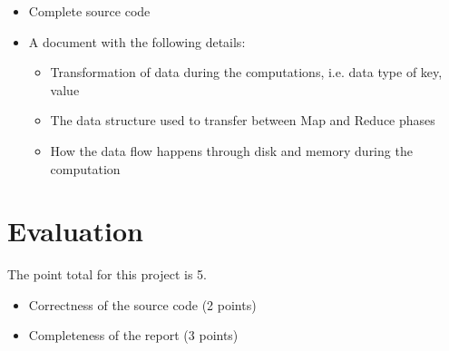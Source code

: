 \begin{itemize}
\item Complete source code
\item A document with the following details:
\begin{itemize}
\item	Transformation of data during the computations, i.e. data type of key, value
\item	The data structure used to transfer between Map and Reduce phases
\item	How the data flow happens through disk and memory during the computation
\end{itemize}
\end{itemize}

\section*{Evaluation}
The point total for this project is 5.
\begin{itemize}
\item Correctness of the source code (2 points)
\item	Completeness of the report (3 points)
\end{itemize}

